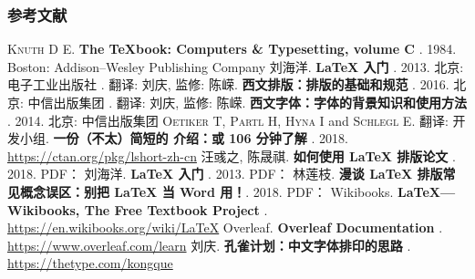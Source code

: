 \begin{frame}[fragile]
\frametitle{参考文献}
\begin{multicols}{2}
\tiny
\newcommand\BOOK[1]{\textbf{#1}}
\newcommand\TAG[1]{\CASE{[#1]}}
\begin{thebibliography}{99}
  \bibitem{}
    \textsc{Knuth D E}.
    \newblock \BOOK{The \TeX book: Computers \& Typesetting, volume C} \TAG{M}. 1984.
    \newblock Boston: Addison--Wesley Publishing Company
  \bibitem{}
    刘海洋.
    \newblock \BOOK{\LaTeX{} 入门} \TAG{M}. 2013.
    \newblock 北京: 电子工业出版社
  \bibitem{}
    . 翻译: 刘庆, 监修: 陈嵘.
    \newblock \BOOK{西文排版：排版的基础和规范} \TAG{M}. 2016.
    \newblock 北京: 中信出版集团
  \bibitem{}
    . 翻译: 刘庆, 监修: 陈嵘.
    \newblock \BOOK{西文字体：字体的背景知识和使用方法} \TAG{M}. 2014.
    \newblock 北京: 中信出版集团
  \bibitem{}
    \textsc{Oetiker T}, \textsc{Partl H}, \textsc{Hyna I} and \textsc{Schlegl E}.
    翻译: \CTeX{} 开发小组.
    \newblock \BOOK{一份（不太）简短的 \LaTeXe{} 介绍：或 106 分钟了解 \LaTeXe{}} \TAG{EB/OL}. 2018.
    \newblock \url{https://ctan.org/pkg/lshort-zh-cn}
  \bibitem{}
    汪彧之, 陈晟祺.
    \newblock \BOOK{如何使用 \LaTeX{} 排版论文} \TAG{EB/OL}. 2018.
    \newblock PDF：
      \href{https://github.com/tuna/thulib-latex-talk/raw/master/latex-talk.pdf}{\faDownload}
  \bibitem{}
    刘海洋.
    \newblock \BOOK{\LaTeX{} 入门} \TAG{EB/OL}. 2013.
    \newblock PDF：
      \href{https://bbs.pku.edu.cn/attach/e7/f2/e7f2bb698b9c3672/tex_intro_talk.pdf}{\faDownload}
  \bibitem{}
    林莲枝.
    \newblock \BOOK{漫谈 \LaTeX{} 排版常见概念误区：别把 \LaTeX{} 当 Word 用！}\TAG{EB/OL}. 2018.
    \newblock PDF：
      \href{http://static.latexstudio.net/wp-content/uploads/2018/03/LianTze-presentation-0320-forReading.pdf}{\faDownload}
  \bibitem{}
    Wikibooks.
    \newblock \BOOK{\LaTeX{}---Wikibooks, The Free Textbook Project} \TAG{EB/OL}.
    \newblock \url{https://en.wikibooks.org/wiki/LaTeX}
  \bibitem{}
    Overleaf.
    \newblock \BOOK{Overleaf Documentation} \TAG{EB/OL}.
    \newblock \url{https://www.overleaf.com/learn}
  \bibitem{}
    刘庆.
    \newblock \BOOK{孔雀计划：中文字体排印的思路} \TAG{EB/OL}.
    \newblock \url{https://thetype.com/kongque}
\end{thebibliography}
\end{multicols}
\end{frame}
